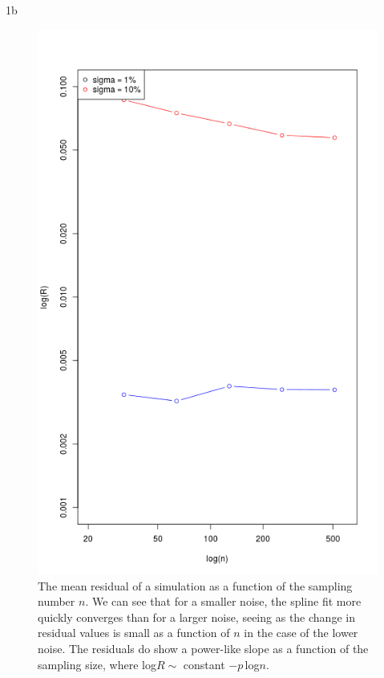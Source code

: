 \documentclass[11pt]{article}
\begin{document}
\begin{homeworkProblem}
\begin{homeworkSection}{1b}
\begin{figure}[!ht]
            \begin{centering}
                \includegraphics[scale=0.6]{hw8_1b_logR_vs_logn.png}

                \caption{The mean residual of a simulation as a function of the
                    sampling number $n$.  We can see that for a smaller noise,
                    the spline fit more quickly converges than for a larger
                    noise, seeing as the change in residual values is small as
                a function of $n$ in the case of the lower noise. The residuals
            do show a power-like slope as a function of the sampling size,
        where log$R \sim$ constant $-p$\,log$n$.}

            \end{centering}
        \end{figure}


    \end{homeworkSection}

\end{homeworkProblem}
\end{document}
